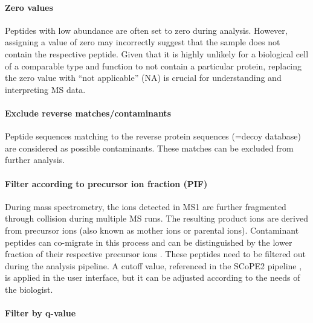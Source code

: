 \documentclass[
  11pt,
]{article}
\begin{document}
\hypertarget{zero-values}{%
\paragraph{Zero values}\label{zero-values}}

Peptides with low abundance are often set to zero during analysis.
However, assigning a value of zero may incorrectly suggest that the
sample does not contain the respective peptide. Given that it is highly
unlikely for a biological cell of a comparable type and function to not
contain a particular protein, replacing the zero value with ``not
applicable'' (NA) is crucial for understanding and interpreting MS data.

\hypertarget{exclude-reverse-matchescontaminants}{%
\paragraph{Exclude reverse
matches/contaminants}\label{exclude-reverse-matchescontaminants}}

Peptide sequences matching to the reverse protein sequences (=decoy
database) are considered as possible contaminants. These matches can be
excluded from further analysis.

\hypertarget{filter-according-to-precursor-ion-fraction-pif}{%
\paragraph{Filter according to precursor ion fraction
(PIF)}\label{filter-according-to-precursor-ion-fraction-pif}}

During mass spectrometry, the ions detected in MS1 are further
fragmented through collision during multiple MS runs. The resulting
product ions are derived from precursor ions (also known as mother ions
or parental ions). Contaminant peptides can co-migrate in this process
and can be distinguished by the lower fraction of their respective
precursor ions \citep{Tannous2020}. These peptides need to be filtered
out during the analysis pipeline. A cutoff value, referenced in the
SCoPE2 pipeline \citep{Specht2021}, is applied in the user interface,
but it can be adjusted according to the needs of the biologist.

\hypertarget{filter-by-q-value}{%
\paragraph{Filter by q-value}\label{filter-by-q-value}}
\end{document}
